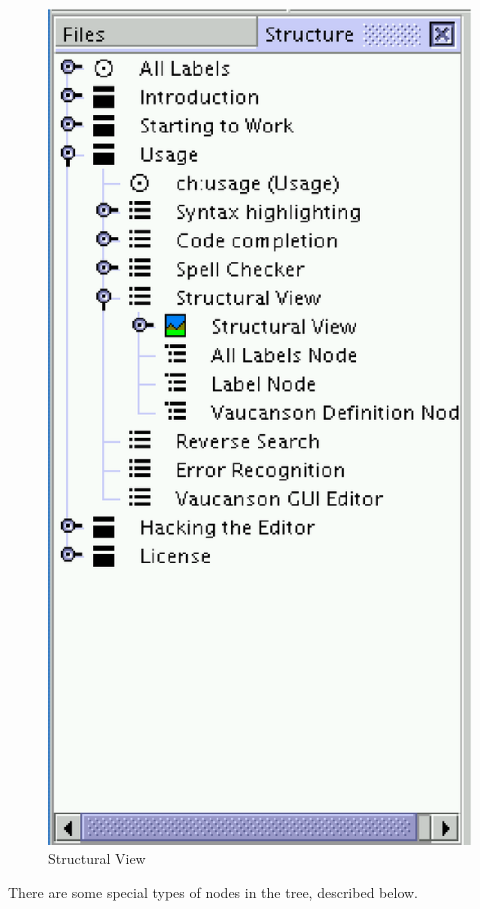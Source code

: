 \documentclass{article}
\begin{document}
\begin{figure}
\caption{Structural View}
\label{fig:structural:view}
\includegraphics[]{structural_view.eps}
\end{figure}

There are some special types of nodes in the tree, described below.
\end{document}
